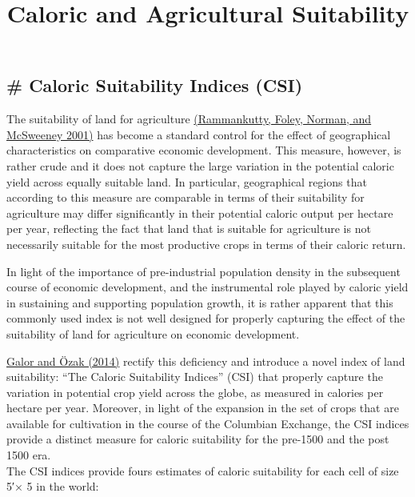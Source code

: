 \documentclass{article}
\title{Caloric and Agricultural Suitability}
\begin{document}
    
    
    \maketitle
    
    

    
    \subsection{\# Caloric Suitability Indices
(CSI)}\label{caloric-suitability-indices-csi}

    The suitability of land for agriculture
\href{http://www.sage.wisc.edu/atlas/maps.php?datasetid=19\&includerelatedlinks=1\&dataset=19}{(Rammankutty,
Foley, Norman, and McSweeney 2001)} has become a standard control for
the effect of geographical characteristics on comparative economic
development. This measure, however, is rather crude and it does not
capture the large variation in the potential caloric yield across
equally suitable land. In particular, geographical regions that
according to this measure are comparable in terms of their suitability
for agriculture may differ significantly in their potential caloric
output per hectare per year, reflecting the fact that land that is
suitable for agriculture is not necessarily suitable for the most
productive crops in terms of their caloric return.

In light of the importance of pre-industrial population density in the
subsequent course of economic development, and the instrumental role
played by caloric yield in sustaining and supporting population growth,
it is rather apparent that this commonly used index is not well designed
for properly capturing the effect of the suitability of land for
agriculture on economic development.

\href{https://ideas.repec.org/p/smu/ecowpa/1407.html}{Galor and Özak
(2014)} rectify this deficiency and introduce a novel index of land
suitability: ``The Caloric Suitability Indices'' (CSI) that properly
capture the variation in potential crop yield across the globe, as
measured in calories per hectare per year. Moreover, in light of the
expansion in the set of crops that are available for cultivation in the
course of the Columbian Exchange, the CSI indices provide a distinct
measure for caloric suitability for the pre-1500 and the post 1500
era.\\The CSI indices provide fours estimates of caloric suitability for
each cell of size 5′× 5 in the world:
\end{document}
